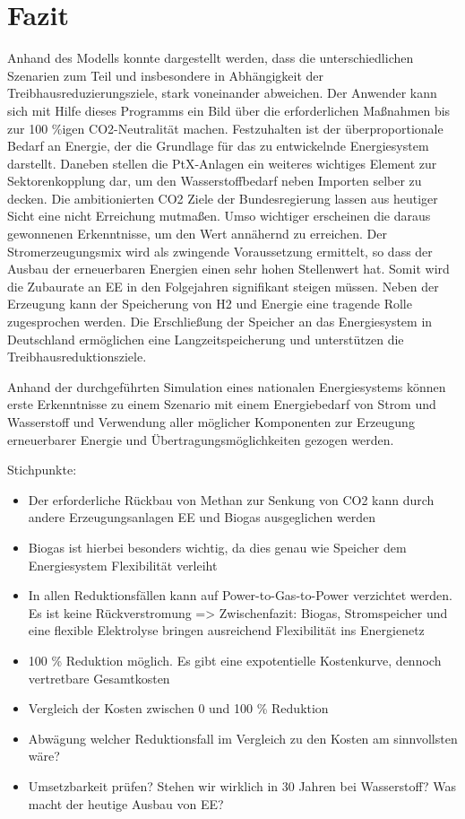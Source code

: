 \section{Fazit}
Anhand des Modells konnte dargestellt werden, dass die unterschiedlichen Szenarien zum Teil und insbesondere in Abhängigkeit der Treibhausreduzierungsziele, stark voneinander abweichen. Der Anwender kann sich mit Hilfe dieses Programms ein Bild über die erforderlichen Maßnahmen bis zur 100 \%igen CO2-Neutralität machen. 
Festzuhalten ist der überproportionale Bedarf an Energie, der die Grundlage für das zu entwickelnde Energiesystem darstellt. Daneben stellen die PtX-Anlagen ein weiteres wichtiges Element zur Sektorenkopplung dar, um den Wasserstoffbedarf neben Importen selber zu decken. 
Die ambitionierten CO2 Ziele der Bundesregierung lassen aus heutiger Sicht eine nicht Erreichung mutmaßen. Umso wichtiger erscheinen die daraus gewonnenen Erkenntnisse, um den Wert annähernd zu erreichen. Der Stromerzeugungsmix wird als zwingende Voraussetzung ermittelt, so dass der Ausbau der erneuerbaren Energien einen sehr hohen Stellenwert hat. Somit wird die Zubaurate an EE in den Folgejahren signifikant steigen müssen. 
Neben der Erzeugung kann der Speicherung von H2 und Energie eine tragende Rolle zugesprochen werden. Die Erschließung der Speicher an das Energiesystem in Deutschland ermöglichen eine Langzeitspeicherung und unterstützen die Treibhausreduktionsziele. 

\newpage
Anhand der durchgeführten Simulation eines nationalen Energiesystems können erste Erkenntnisse zu einem Szenario mit einem Energiebedarf von Strom und Wasserstoff und Verwendung aller möglicher Komponenten zur Erzeugung erneuerbarer Energie und Übertragungsmöglichkeiten gezogen werden.

Stichpunkte:
\begin{itemize}
  \item Der erforderliche Rückbau von Methan zur Senkung von CO2 kann durch andere Erzeugungsanlagen EE und Biogas ausgeglichen werden
  \item Biogas ist hierbei besonders wichtig, da dies genau wie Speicher dem Energiesystem Flexibilität verleiht
  \item In allen Reduktionsfällen kann auf Power-to-Gas-to-Power verzichtet werden. Es ist keine Rückverstromung => Zwischenfazit: Biogas, Stromspeicher und eine flexible Elektrolyse bringen ausreichend Flexibilität ins Energienetz
  \item 100 \% Reduktion möglich. Es gibt eine expotentielle Kostenkurve, dennoch vertretbare Gesamtkosten
  \item Vergleich der Kosten zwischen 0 und 100 \% Reduktion
  \item Abwägung welcher Reduktionsfall im Vergleich zu den Kosten am sinnvollsten wäre?
  \item Umsetzbarkeit prüfen? Stehen wir wirklich in 30 Jahren bei Wasserstoff? Was macht der heutige Ausbau von EE? 
\end{itemize}

